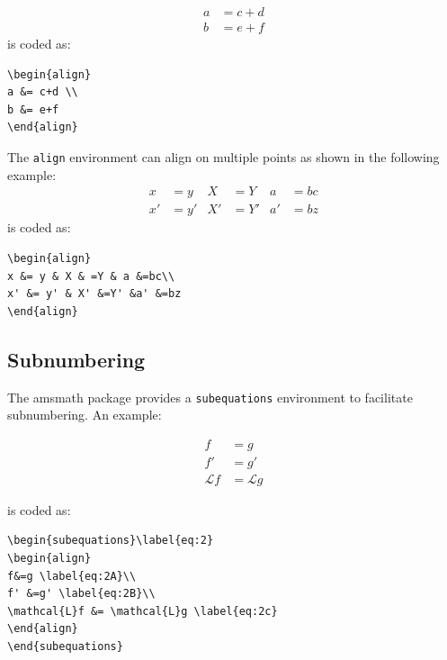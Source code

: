 \documentclass[lettersize,journal]{IEEEtran}
\begin{document}
\begin{align}
a &= c+d \\
b &= e+f
\end{align}
\noindent is coded as:
\begin{verbatim}
\begin{align}
a &= c+d \\
b &= e+f
\end{align}
\end{verbatim}

The {\tt{align}} environment can align on multiple  points as shown in the following example:
\begin{align}
x &= y & X & =Y & a &=bc\\
x' &= y' & X' &=Y' &a' &=bz
\end{align}
\noindent is coded as:
\begin{verbatim}
\begin{align}
x &= y & X & =Y & a &=bc\\
x' &= y' & X' &=Y' &a' &=bz
\end{align}
\end{verbatim}





\subsection{Subnumbering}
The amsmath package provides a {\tt{subequations}} environment to facilitate subnumbering. An example:

\begin{subequations}\label{eq:2}
\begin{align}
f&=g \label{eq:2A}\\
f' &=g' \label{eq:2B}\\
\mathcal{L}f &= \mathcal{L}g \label{eq:2c}
\end{align}
\end{subequations}

\noindent is coded as:
\begin{verbatim}
\begin{subequations}\label{eq:2}
\begin{align}
f&=g \label{eq:2A}\\
f' &=g' \label{eq:2B}\\
\mathcal{L}f &= \mathcal{L}g \label{eq:2c}
\end{align}
\end{subequations}

\end{verbatim}
\end{document}

